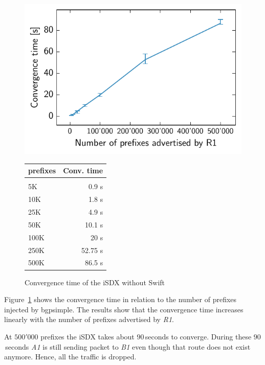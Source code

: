 \begin{figure}
\centering
\begin{minipage}[t]{.4\textwidth}
\centering
\vspace{0pt}
\includegraphics[scale = 1]{Figures/noswift.pdf}
\end{minipage}\hfill
\begin{minipage}[t]{.4\textwidth}
\centering
\vspace{0pt}
\begin{tabular}{@{}lr@{}}
	\\
	prefixes & Conv. time \\
	\hline
	\\
    5K & 0.9 s  \\
    10K & 1.8 s   \\
    25K & 4.9 s   \\
    50K & 10.1 s  \\
    100K & 20 s \\
    250K & 52.75 s   \\
    500K & 86.5 s  \\
\end{tabular}
\end{minipage}
\caption{Convergence time of the iSDX without Swift}
\label{fig:noswift}
\end{figure}

Figure~\ref{fig:noswift} shows the convergence time in relation to the number of prefixes injected by bgpsimple. The results show that the convergence time increases linearly with the number of prefixes advertised by \emph{R1}.

At $500'000$ prefixes the iSDX takes about $90$\,seconds to converge. During these $90$\,seconds \emph{A1} is still sending packet to \emph{B1} even though that route does not exist anymore. Hence, all the traffic is dropped. 

